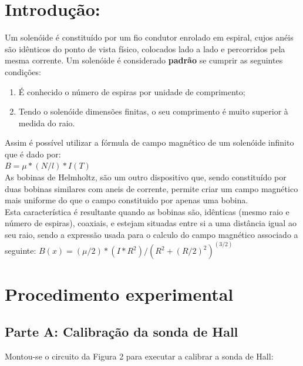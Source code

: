 
\section*{Introdução:}

Um solenóide é constituído por um fio condutor enrolado em espiral, cujos anéis são idênticos do ponto de vista físico, colocados lado a lado e percorridos pela mesma corrente. Um solenóide é considerado \textbf{padrão} se cumprir as seguintes condições: 
\begin{enumerate}
\item É conhecido o número de espiras por unidade de comprimento;
\item Tendo o solenóide dimensões finitas, o seu comprimento  é muito superior à medida do raio.
\end{enumerate} 
Assim é possível utilizar a fórmula de campo magnético de um solenóide infinito que é dado por: \\ 
$B=\mu*(N/l)*I (T)$ \\

As bobinas de Helmholtz, são um outro dispositivo que, sendo constituído por duas bobinas similares com aneis de corrente, permite criar um campo magnético mais uniforme do que o campo constituido por apenas uma bobina. \\
Esta característica é resultante quando as bobinas são, idênticas (mesmo raio e número de espiras), coaxiais, e estejam situadas entre si a uma distância igual ao seu raio, sendo a expressão usada para o calculo do campo magnético associado a seguinte:
$B(x)=( \mu /2)*(I*R^2)/(R^2 + (R/2)^2 )^(3/2)$ \\

\section*{Procedimento experimental}
\subsection*{Parte A: Calibração da sonda de Hall}
Montou-se o circuito da Figura 2 para executar a calibrar a sonda de Hall:

